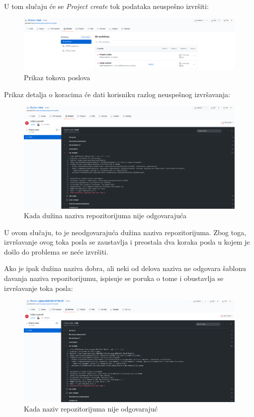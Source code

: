 \documentclass[12pt]{report}
\begin{document}
U tom slučaju će se \textit{Project create} tok podataka neuspešno izvršiti:

\begin{figure}[H]
    \centering
    \includegraphics[width=\linewidth]{images/18.png}
    \caption{Prikaz tokova poslova}
\end{figure}

Prikaz detalja o koracima će dati korisniku razlog neuspešnog izvršavanja:

\begin{figure}[H]
    \centering
    \includegraphics[width=\linewidth]{images/19.png}
    \caption{Kada dužina naziva repozitorijuma nije odgovarajuća}
\end{figure}

U ovom slučaju, to je neodgovarajuća dužina naziva repozitorijuma. Zbog toga, izvršavanje ovog toka posla se zaustavlja i preostala dva koraka posla u kojem je došlo do problema se neće izvršiti.

Ako je ipak dužina naziva dobra, ali neki od delova naziva ne odgovara šablonu davanja naziva repozitorijumu, ispisuje se poruka o tome i obustavlja se izvršavanje toka posla:

\begin{figure}[H]
    \centering
    \includegraphics[width=\linewidth]{images/20.png}
    \caption{Kada naziv repozitorijuma nije odgovarajuć}
\end{figure}
\end{document}
